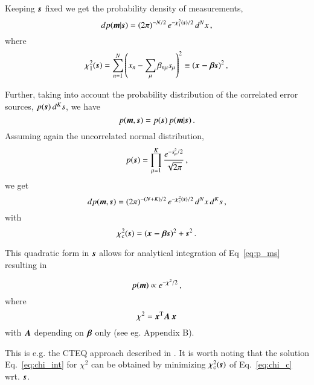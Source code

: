 Keeping $\mb \rs$ fixed we get the probability density of measurements,
\begin{equation}
dp(\mb{m}| \mb s) =
 (2\pi)^{-N/2}\, e^{-\chi_1^2(\mbs\rs)/2}\, d^Nx
\,,
\end{equation}
where
\begin{equation}
\label{eq:chi1}
\chi_1^2(\mb\rs) = \sum_{n=1}^N
\left( x_n - \sum_\mu \beta_{n\mu} \rs_\mu \right)^2
\equiv (\mb{x - \beta s})^2
\,,
\end{equation}

Further, taking into account the probability distribution of the correlated error sources,
$p(\mb s)\, d^Ks$, we have
\begin{equation}
p(\mb{m},\mb s) = p(\mb s)\, p(\mb{m} | \mb s)
\,.
\end{equation}
Assuming again the uncorrelated normal distribution,
\begin{equation}
p(\mb s) = \prod_{\mu=1}^K \frac{e^{-s_\mu^2/2}}{\sqrt{2\pi}}
\,,
\end{equation}
we get
\begin{equation}
\label{eq:p_ms}
dp(\mb{m},\mb s) =
  (2\pi)^{-(N+K)/2}\, e^{-\chi_{\mathrm c}^2(\mbs\rs)/2}
  \,d^Nx\, d^Ks
\,,
\end{equation}
with
\begin{equation}
\label{eq:chi_c}
\chi_{\mathrm c}^2(\mb\rs) = 
(\mb{x - \beta s})^2 + \mb s^2
\,.
\end{equation}

This quadratic form in $\mb s$ allows for analytical integration of Eq~\ref{eq:p_ms}
resulting in

\begin{equation}
p(\mb{m}) \propto e^{-\chi^2/2}
\,,
\end{equation}
where
\begin{equation}
\label{eq:chi_int}
\chi^2 = \mb x^{\mathrm{T}} \mb{A\,x}
\end{equation}
with $\mb A$ depending on $\mb\beta$ only
(see eg. \cite{Stump:2001gu} Appendix B).

This is e.g. the CTEQ approach described in \cite{Stump:2001gu}.
It is worth noting that the solution Eq.~\ref{eq:chi_int} for $\chi^2$
can be obtained by minimizing $\chi_{\mathrm c}^2(\mb\rs)$ of Eq.~\ref{eq:chi_c} wrt. $\mb\rs$.

